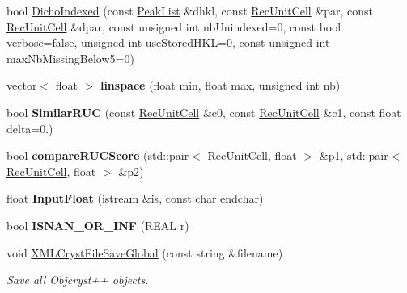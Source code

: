\begin{DoxyCompactItemize}
bool \mbox{\hyperlink{namespace_obj_cryst_a1663a65913645de7313e28d464e28bd0}{Dicho\+Indexed}} (const \mbox{\hyperlink{class_obj_cryst_1_1_peak_list}{Peak\+List}} \&dhkl, const \mbox{\hyperlink{class_obj_cryst_1_1_rec_unit_cell}{Rec\+Unit\+Cell}} \&par, const \mbox{\hyperlink{class_obj_cryst_1_1_rec_unit_cell}{Rec\+Unit\+Cell}} \&dpar, const unsigned int nb\+Unindexed=0, const bool verbose=false, unsigned int use\+Stored\+H\+KL=0, const unsigned int max\+Nb\+Missing\+Below5=0)
\item 
\mbox{\label{namespace_obj_cryst_ab4232087aee629f4061cc62ac5b5c2d4}} 
vector$<$ float $>$ {\bfseries linspace} (float min, float max, unsigned int nb)
\item 
\mbox{\label{namespace_obj_cryst_a3866d29e27cec31d75a4c5e76a231850}} 
bool {\bfseries Similar\+R\+UC} (const \mbox{\hyperlink{class_obj_cryst_1_1_rec_unit_cell}{Rec\+Unit\+Cell}} \&c0, const \mbox{\hyperlink{class_obj_cryst_1_1_rec_unit_cell}{Rec\+Unit\+Cell}} \&c1, const float delta=0.)
\item 
\mbox{\label{namespace_obj_cryst_aef4735338e36676109144ca89e4c81db}} 
bool {\bfseries compare\+R\+U\+C\+Score} (std\+::pair$<$ \mbox{\hyperlink{class_obj_cryst_1_1_rec_unit_cell}{Rec\+Unit\+Cell}}, float $>$ \&p1, std\+::pair$<$ \mbox{\hyperlink{class_obj_cryst_1_1_rec_unit_cell}{Rec\+Unit\+Cell}}, float $>$ \&p2)
\item 
\mbox{\label{namespace_obj_cryst_a5689401ad95bba690af0cad5e5125091}} 
float {\bfseries Input\+Float} (istream \&is, const char endchar)
\item 
\mbox{\label{namespace_obj_cryst_a6c80e3e42093f5f02d7a31e0119bed24}} 
bool {\bfseries I\+S\+N\+A\+N\+\_\+\+O\+R\+\_\+\+I\+NF} (R\+E\+AL r)
\item 
void \mbox{\hyperlink{namespace_obj_cryst_af1f43834dd8e606cefe6f8fdc0f79a13}{X\+M\+L\+Cryst\+File\+Save\+Global}} (const string \&filename)
\begin{DoxyCompactList}\small\item\em Save all Objcryst++ objects. \end{DoxyCompactList}\item 
\mbox{\label{namespace_obj_cryst_a0beabaed9cbc7f926dcbd3bfd91da695}} 

\end{DoxyCompactItemize}
